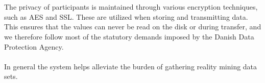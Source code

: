 \\\\
The privacy of participants is maintained through various encryption techniques, such as AES and SSL. These are utilized when storing and transmitting data. This ensures that the values can never be read on the disk or during transfer, and we therefore follow most of the statutory demands imposed by the Danish Data Protection Agency. 
\\\\
In general the system helps alleviate the burden of gathering reality mining data sets. 


